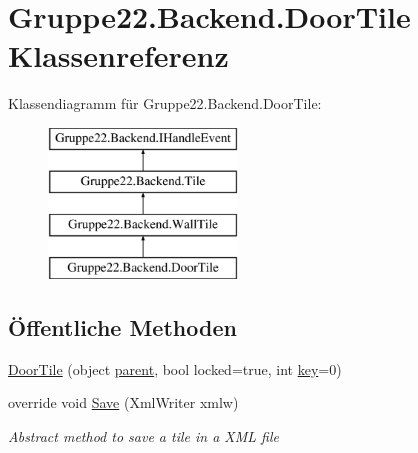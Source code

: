 \hypertarget{class_gruppe22_1_1_backend_1_1_door_tile}{\section{Gruppe22.\-Backend.\-Door\-Tile Klassenreferenz}
\label{class_gruppe22_1_1_backend_1_1_door_tile}
}
Klassendiagramm für Gruppe22.\-Backend.\-Door\-Tile\-:\begin{figure}[H]
\begin{center}
\leavevmode
\includegraphics[height=4.000000cm]{class_gruppe22_1_1_backend_1_1_door_tile}
\end{center}
\end{figure}
\subsection*{Öffentliche Methoden}
\begin{DoxyCompactItemize}
\item 
\hyperlink{class_gruppe22_1_1_backend_1_1_door_tile_ab0e5117c31167d0107e0b677d2ea09b4}{Door\-Tile} (object \hyperlink{class_gruppe22_1_1_backend_1_1_tile_abc12933c70eb3a2ebbb2fde9f45c2632}{parent}, bool locked=true, int \hyperlink{class_gruppe22_1_1_backend_1_1_door_tile_a25b6d03598ee1e0d2fab39b77586c1e9}{key}=0)
\item 
override void \hyperlink{class_gruppe22_1_1_backend_1_1_door_tile_a89bddd70828e64c6491d92a225db0474}{Save} (Xml\-Writer xmlw)
\begin{DoxyCompactList}\small\item\em Abstract method to save a tile in a X\-M\-L file \end{DoxyCompactList}\end{DoxyCompactItemize}
